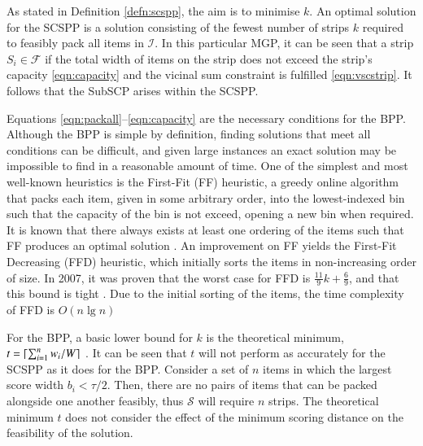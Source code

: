 \documentclass{elsarticle}
\begin{document}
\noindent As stated in Definition \ref{defn:scspp}, the aim is to minimise $k$. An optimal solution for the SCSPP is a solution consisting of the fewest number of strips $k$ required to feasibly pack all items in $\mathcal{I}$. In this particular MGP, it can be seen that a strip $S_i \in \mathcal{F}$ if the total width of items on the strip does not exceed the strip's capacity \eqref{eqn:capacity} and the vicinal sum constraint is fulfilled \eqref{eqn:vscstrip}. It follows that the SubSCP arises within the SCSPP.

Equations \eqref{eqn:packall}--\eqref{eqn:capacity} are the necessary conditions for the BPP. Although the BPP is simple by definition, finding solutions that meet all conditions can be difficult, and given large instances an exact solution may be impossible to find in a reasonable amount of time. One of the simplest and most well-known heuristics is the First-Fit (FF) heuristic, a greedy online algorithm that packs each item, given in some arbitrary order, into the lowest-indexed bin such that the capacity of the bin is not exceed, opening a new bin when required. It is known that there always exists at least one ordering of the items such that FF produces an optimal solution \cite{lewis2009}. An improvement on FF yields the First-Fit Decreasing (FFD) heuristic, which initially sorts the items in non-increasing order of size. In 2007, it was proven that the worst case for FFD is $\frac{11}{9}k + \frac{6}{9}$, and that this bound is tight \cite{dosa2007}. Due to the initial sorting of the items, the time complexity of FFD is $O(n \lg n)$

For the BPP, a basic lower bound for $k$ is the theoretical minimum, $t = \lceil\sum_{i=1}^{n} w_i / W\rceil$ \cite{martello1990l}. It can be seen that $t$ will not perform as accurately for the SCSPP as it does for the BPP. Consider a set of $n$ items in which the largest score width $b_i < \tau/2$. Then, there are no pairs of items that can be packed alongside one another feasibly, thus $\mathcal{S}$ will require $n$ strips. The theoretical minimum $t$ does not consider the effect of the minimum scoring distance on the feasibility of the solution. 
\end{document}
